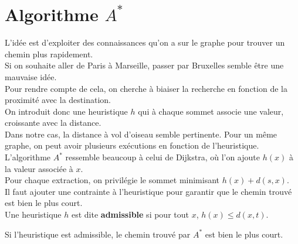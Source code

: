 \documentclass[french, 11pt]{article}
\begin{document}


\section{Algorithme \texorpdfstring{$A^*$}{Lg}}

\begin{defi}{}{}
    L'idée est d'exploiter des connaissances qu'on a sur le graphe pour trouver un chemin plus rapidement.\\
    Si on souhaite aller de Paris à Marseille, passer par Bruxelles semble être une mauvaise idée.\\
    Pour rendre compte de cela, on cherche à biaiser la recherche en fonction de la proximité avec la destination.\\
    On introduit donc une heuristique $h$ qui à chaque sommet associe une valeur, croissante avec la distance.\\
    Dans notre cas, la distance à vol d'oiseau semble pertinente. Pour un même graphe, on peut avoir plusieurs exécutions en fonction de l'heuristique.\n
    L'algorithme $A^*$ ressemble beaucoup à celui de Dijkstra, où l'on ajoute $h(x)$ à la valeur associée à $x$.\\
    Pour chaque extraction, on privilégie le sommet minimisant $h(x)+d(s,x)$.\\
    Il faut ajouter une contrainte à l'heuristique pour garantir que le chemin trouvé est bien le plus court.\\
    Une heuristique $h$ est dite \textbf{admissible} si pour tout $x$, $h(x)\leq d(x,t)$.
\end{defi}

\begin{prop}{}{}
    Si l'heuristique est admissible, le chemin trouvé par $A^*$ est bien le plus court. 
\end{prop}
\end{document}

